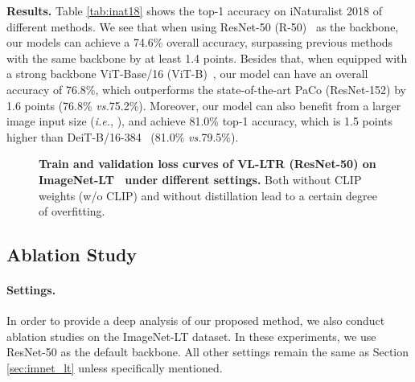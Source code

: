 \documentclass[runningheads]{llncs}
\def\vs{\emph{vs.}}
\def\ie{\emph{i.e.}}
\begin{document}
\noindent\textbf{Results.} Table \ref{tab:inat18} shows the top-1 accuracy on iNaturalist 2018 of different methods. 
We see that when using ResNet-50 (R-50)~\cite{he2016deep} as the backbone, our models can achieve a 74.6\% overall accuracy, surpassing previous methods with the same backbone by at least 1.4 points.
Besides that, when equipped with a strong backbone ViT-Base/16 (ViT-B)~\cite{dosovitskiy2020image}, our model can have an overall accuracy of 76.8\%, which outperforms the state-of-the-art PaCo (ResNet-152) by 1.6 points (76.8\% \vs 75.2\%). 
Moreover, our model can also benefit from a larger image input size (\ie, ), and achieve 81.0\% top-1 accuracy, which is 1.5 points higher than DeiT-B/16-384~\cite{touvron2020training} (81.0\% \vs 79.5\%).

\begin{figure*}[t]
		\centering
		\setlength{\fboxrule}{0pt}
\caption{
		   		\textbf{Train and validation loss curves of VL-LTR (ResNet-50) on ImageNet-LT~\cite{liu2019large} under different settings.} Both without CLIP~\cite{clip} weights (w/o CLIP) and without distillation lead to a certain degree of overfitting.
		}
		\label{fig:loss}
\end{figure*}

\subsection{Ablation Study}
\label{sec:abl}
\paragraph{Settings.} In order to provide a deep analysis of our proposed method, we also conduct ablation studies on the ImageNet-LT dataset.
In these experiments, we use ResNet-50 as the default backbone.
All other settings remain the same as Section \ref{sec:imnet_lt} unless specifically mentioned.
\end{document}
